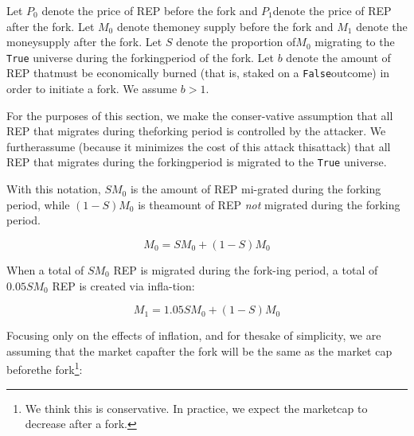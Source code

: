 \documentclass[12pt,floatfix,reprint,nofootinbib,amsmath,amssymb,epsfig,pre,floats,letterpaper,groupedaffiliation]{revtex4-1}
\theoremstyle{definition}
\theoremstyle{definition}
\begin{document}
Let $P_0$ denote the price of REP before the fork and $P_1$\linebreak denote the price of REP after the fork. Let $M_0$ denote the\linebreak money supply before the fork and $M_1$ denote the money\linebreak supply after the fork. Let $S$ denote the proportion of\linebreak $M_0$ migrating to the \texttt{True} universe during the forking\linebreak period of the fork. Let $b$ denote the amount of REP that\linebreak must be economically burned (that is, staked on a \texttt{False}\linebreak outcome) in order to initiate a fork. We assume $b > 1$.

For the purposes of this section, we make the conser-\linebreak vative assumption that all REP that migrates during the\linebreak forking period is controlled by the attacker. We further\linebreak assume (because it minimizes the cost of this attack this\linebreak attack) that all REP that migrates during the forking\linebreak period is migrated to the \texttt{True} universe.

With this notation, $SM_0$ is the amount of REP mi-\linebreak grated during the forking period, while $(1 - S)M_0$ is the\linebreak amount of REP \textit{not} migrated during the forking period.

\begin{equation}
M_0 = SM_0 + (1 - S)M_0\tag{D1}
\end{equation}

When a total of $SM_0$ REP is migrated during the fork-\linebreak ing period, a total of $0.05SM_0$ REP is created via infla-\linebreak tion:

\begin{equation}
M_1 = 1.05SM_0 + (1 - S)M_0\tag{D2}
\end{equation}

Focusing only on the effects of inflation, and for the\linebreak sake of simplicity, we are assuming that the market cap\linebreak after the fork will be the same as the market cap before\linebreak the fork\footnote{We think this is conservative. In practice, we expect the market\linebreak cap to decrease after a fork.}:
\end{document}
